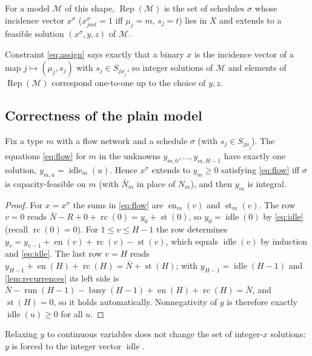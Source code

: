 \documentclass[11pt,a4paper]{article}
\newcommand{\Rep}{\operatorname{Rep}}
\newcommand{\Run}{\operatorname{run}}
\newcommand{\Busy}{\operatorname{busy}}
\newcommand{\Starts}{\operatorname{st}}
\newcommand{\Ends}{\operatorname{en}}
\newcommand{\Rc}{\operatorname{rc}}
\newcommand{\Idle}{\operatorname{idle}}
\newcommand{\code}[1]{\texttt{#1}}
\begin{document}
\begin{definition}
For a model $\mathcal{M}$ of this shape, $\Rep(\mathcal M)$ is the set of
schedules $\sigma$ whose incidence vector $x^\sigma$ ($x^\sigma_{jmt}=1$ iff
$\mu_j=m$, $s_j=t$) lies in $X$ and extends to a feasible solution
$(x^\sigma,y,z)$ of $\mathcal M$.
\end{definition}

Constraint \eqref{eq:assign} says exactly that a binary $x$ is the incidence
vector of a map $j\mapsto(\mu_j,s_j)$ with $s_j\in S_{j\mu_j}$, so integer
solutions of $\mathcal M$ and elements of $\Rep(\mathcal M)$ correspond
one-to-one up to the choice of $y,z$.

\subsection{Correctness of the plain model}

\begin{theorem}\label{thm:grid}
Fix a type $m$ with a flow network and a schedule $\sigma$ (with
$s_j\in S_{j\mu_j}$). The equations \eqref{eq:flow} for $m$ in the unknowns
$y_{m,0},\dots,y_{m,H-1}$ have exactly one solution, $y_{m,u}=\Idle_m(u)$.
Hence $x^\sigma$ extends to $y_m\ge0$ satisfying \eqref{eq:flow} iff
$\sigma$ is capacity-feasible on $m$ (with $\bar N_m$ in place of $N_m$), and
then $y_m$ is integral.
\end{theorem}
\begin{proof}
For $x=x^\sigma$ the sums in \eqref{eq:flow} are $\Ends_m(v)$ and
$\Starts_m(v)$. The row $v=0$ reads $\bar N-R+0+\Rc(0)=y_0+\Starts(0)$, so
$y_0=\Idle(0)$ by \eqref{eq:idle} (recall $\Rc(0)=0$). For $1\le v\le H-1$ the
row determines $y_v=y_{v-1}+\Ends(v)+\Rc(v)-\Starts(v)$, which equals
$\Idle(v)$ by induction and \eqref{eq:idle}. The last row $v=H$ reads
$y_{H-1}+\Ends(H)+\Rc(H)=\bar N+\Starts(H)$; with $y_{H-1}=\Idle(H-1)$ and
\cref{lem:recurrences} its left side is
$\bar N-\Run(H-1)-\Busy(H-1)+\Ends(H)+\Rc(H)=\bar N$, and $\Starts(H)=0$, so
it holds automatically. Nonnegativity of $y$ is therefore exactly
$\Idle(u)\ge0$ for all $u$.
\end{proof}

\begin{corollary}[\code{continuous\_idle}]
Relaxing $y$ to continuous variables does not change the set of integer-$x$
solutions: $y$ is forced to the integer vector $\Idle$.
\end{corollary}
\end{document}
